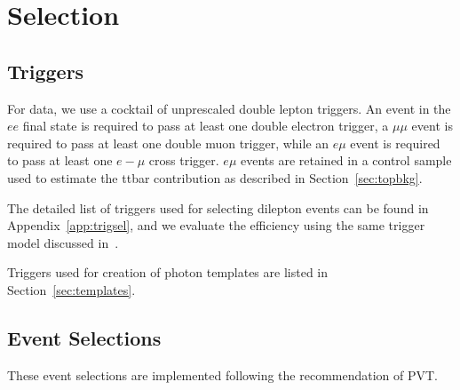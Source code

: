 
\section{Selection}
\label{sec:eventSelection}

\subsection{Triggers}
\label{sec:trigSel}

For data, we use a cocktail of unprescaled %
double lepton triggers. An event
in the $ee$ final state is required to pass at least one %
double electron trigger, a
$\mu\mu$ event is required to pass at least one %
double muon trigger, while an $e\mu$ event is required to pass at least one %
$e-\mu$ cross trigger. 
$e\mu$ events are retained in a control sample used to estimate the ttbar contribution as described in Section~\ref{sec:topbkg}.

The detailed list of triggers used for selecting dilepton events can be found in Appendix~\ref{app:trigsel},
and we evaluate the efficiency using the same trigger model discussed in~\cite{ref:GenericOS}.

Triggers used for creation of photon templates are listed in Section~\ref{sec:templates}.


\subsection{Event Selections}

These event selections are implemented following the recommendation of PVT.

